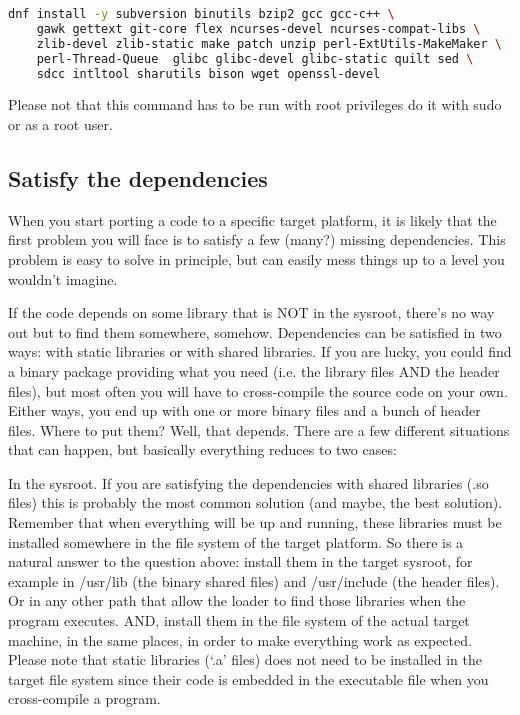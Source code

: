 \begin{lstlisting}[language=bash,basicstyle=\ttfamily\footnotesize,label=fedora-install,caption=Prerequisites installation on Fedora 27]
    dnf install -y subversion binutils bzip2 gcc gcc-c++ \
    gawk gettext git-core flex ncurses-devel ncurses-compat-libs \
    zlib-devel zlib-static make patch unzip perl-ExtUtils-MakeMaker \
    perl-Thread-Queue  glibc glibc-devel glibc-static quilt sed \
    sdcc intltool sharutils bison wget openssl-devel
\end{lstlisting}

Please not that this command has to be run with root privileges do it with sudo or as a root user.

\subsection{Satisfy the dependencies}

When you start porting a code to a specific target platform, it is likely that the first problem you will face is to satisfy a few (many?) missing dependencies.
This problem is easy to solve in principle, but can easily mess things up to a level you wouldn’t imagine.

If the code depends on some library that is NOT in the sysroot, there’s no way out but to find them somewhere, somehow.
Dependencies can be satisfied in two ways: with static libraries or with shared libraries.
If you are lucky, you could find a binary package providing what you need (i.e. the library files AND the header files), but most often you will have to cross-compile the source code on your own.
Either ways, you end up with one or more binary files and a bunch of header files.
Where to put them? Well, that depends.
There are a few different situations that can happen, but basically everything reduces to two cases:

In the sysroot.
If you are satisfying the dependencies with shared libraries (.so files) this is probably the most common solution (and maybe, the best solution).
Remember that when everything will be up and running, these libraries must be installed somewhere in the file system of the target platform.
So there is a natural answer to the question above: install them in the target sysroot, for example in /usr/lib (the binary shared files) and /usr/include (the header files). Or in any other path that allow the loader to find those libraries when the program executes.
AND, install them in the file system of the actual target machine, in the same places, in order to make everything work as expected.
Please note that static libraries (‘.a’ files) does not need to be installed in the target file system since their code is embedded in the executable file when you cross-compile a program.

